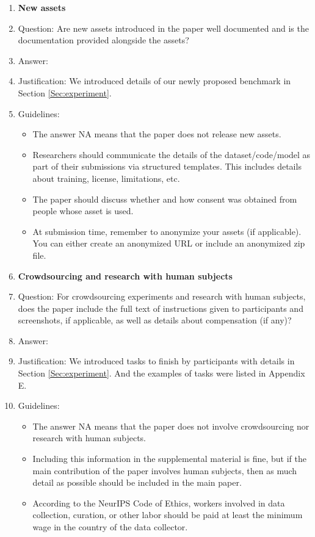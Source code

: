 \documentclass{article}
\begin{document}
\begin{enumerate}
\item {\bf New assets}
    \item[] Question: Are new assets introduced in the paper well documented and is the documentation provided alongside the assets?
    \item[] Answer: \answerYes{} %
    \item[] Justification: We introduced details of our newly proposed benchmark in Section \ref{Sec:experiment}.
    \item[] Guidelines:
    \begin{itemize}
        \item The answer NA means that the paper does not release new assets.
        \item Researchers should communicate the details of the dataset/code/model as part of their submissions via structured templates. This includes details about training, license, limitations, etc. 
        \item The paper should discuss whether and how consent was obtained from people whose asset is used.
        \item At submission time, remember to anonymize your assets (if applicable). You can either create an anonymized URL or include an anonymized zip file.
    \end{itemize}

\item {\bf Crowdsourcing and research with human subjects}
    \item[] Question: For crowdsourcing experiments and research with human subjects, does the paper include the full text of instructions given to participants and screenshots, if applicable, as well as details about compensation (if any)? 
    \item[] Answer: \answerYes{} %
    \item[] Justification: We introduced tasks to finish by participants with details in Section \ref{Sec:experiment}. And the examples of tasks were listed in Appendix E.
    \item[] Guidelines:
    \begin{itemize}
        \item The answer NA means that the paper does not involve crowdsourcing nor research with human subjects.
        \item Including this information in the supplemental material is fine, but if the main contribution of the paper involves human subjects, then as much detail as possible should be included in the main paper. 
        \item According to the NeurIPS Code of Ethics, workers involved in data collection, curation, or other labor should be paid at least the minimum wage in the country of the data collector. 
    \end{itemize}


\end{enumerate}
\end{document}
